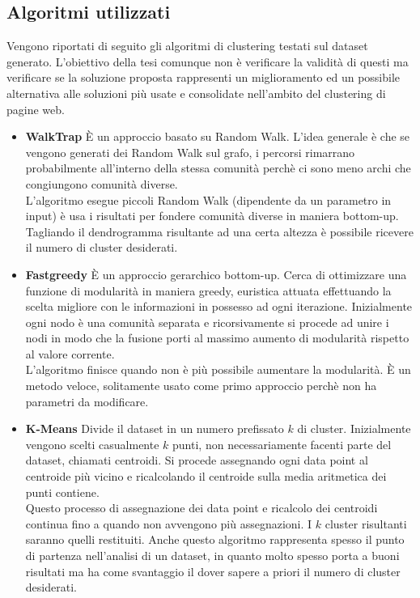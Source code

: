 \subsection{Algoritmi utilizzati}
Vengono riportati di seguito gli algoritmi di clustering testati sul dataset generato. L'obiettivo della tesi comunque non è verificare la validità di questi ma verificare se la soluzione proposta rappresenti un miglioramento ed un possibile alternativa alle soluzioni più usate e consolidate nell'ambito del clustering di pagine web.
\begin{itemize}
\item \textbf{WalkTrap}
È un approccio basato su Random Walk. L'idea generale è che se vengono generati dei Random Walk sul grafo, i percorsi rimarrano probabilmente all'interno della stessa comunità perchè ci sono meno archi che congiungono comunità diverse. 
\\
L'algoritmo esegue piccoli Random Walk (dipendente da un parametro in input) è usa i risultati per fondere comunità diverse in maniera bottom-up. Tagliando il dendrogramma risultante ad una certa altezza è possibile ricevere il numero di cluster desiderati.

\item \textbf{Fastgreedy}
È un approccio gerarchico bottom-up. Cerca di ottimizzare una funzione di modularità in maniera greedy, euristica attuata effettuando la scelta migliore con le informazioni in possesso ad ogni iterazione.
Inizialmente ogni nodo è una comunità separata e ricorsivamente si procede ad unire i nodi in modo che la fusione porti al massimo aumento di modularità rispetto al valore corrente. 
\\
L'algoritmo finisce quando non è più possibile aumentare la modularità. È un metodo veloce, solitamente usato come primo approccio perchè non ha parametri da modificare.
\item \textbf{K-Means}
Divide il dataset in un numero prefissato $k$ di cluster. Inizialmente vengono scelti casualmente $k$ punti, non necessariamente facenti parte del dataset, chiamati centroidi. Si procede assegnando ogni data point al centroide più vicino e ricalcolando il centroide sulla media aritmetica dei punti contiene. 
\\
Questo processo di assegnazione dei data point e ricalcolo dei centroidi continua fino a quando non avvengono più assegnazioni. I $k$ cluster risultanti saranno quelli restituiti. Anche questo algoritmo rappresenta spesso il punto di partenza nell'analisi di un dataset, in quanto molto spesso porta a buoni risultati ma ha come svantaggio il dover sapere a priori il numero di cluster desiderati.


\end{itemize}
